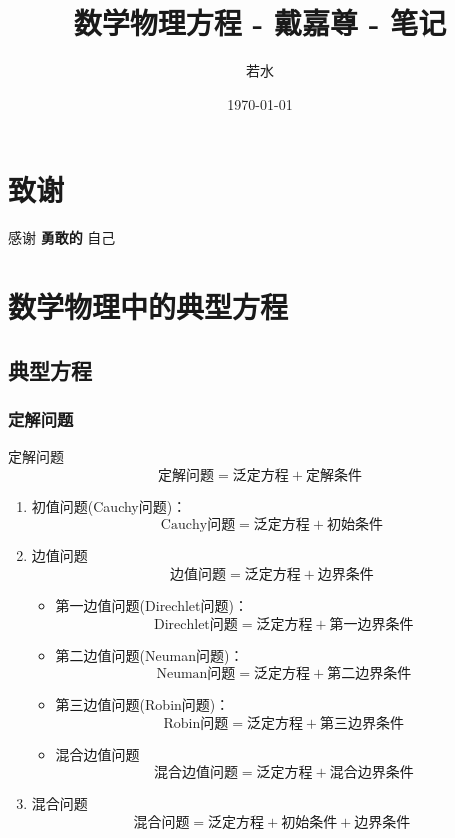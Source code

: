 \documentclass[lang = cn, scheme = chinese, thmcnt = section]{elegantbook}
\title{数学物理方程 - 戴嘉尊 - 笔记}                %
\author{若水}                        %
\date{\today}                       %
\begin{document}
\maketitle       %

\frontmatter     %

\chapter*{致谢}


\vspace*{\fill}
\begin{center}
	
	\large{感谢 \textbf{ 勇敢的 } 自己}
	
\end{center}
\vspace*{\fill}

\tableofcontents %

\mainmatter      %

\chapter{数学物理中的典型方程}

\section{典型方程}

\subsection{定解问题}

\begin{definition}{定解问题}
	$$
	\text{定解问题}=\text{泛定方程}+\text{定解条件}
	$$
	\begin{enumerate}
		\item 初值问题(Cauchy问题)：
		$$
		\text{Cauchy问题}=\text{泛定方程}+\text{初始条件}
		$$
		\item 边值问题
		$$
		\text{边值问题}=\text{泛定方程}+\text{边界条件}
		$$
		\begin{itemize}
			\item 第一边值问题(Direchlet问题)：
			$$
			\text{Direchlet问题}=\text{泛定方程}+\text{第一边界条件}
			$$
			\item 第二边值问题(Neuman问题)：
			$$
			\text{Neuman问题}=\text{泛定方程}+\text{第二边界条件}
			$$
			\item 第三边值问题(Robin问题)：
			$$
			\text{Robin问题}=\text{泛定方程}+\text{第三边界条件}
			$$
			\item 混合边值问题
			$$
			\text{混合边值问题}=\text{泛定方程}+\text{混合边界条件}
			$$
		\end{itemize}
		\item 混合问题
		$$
		\text{混合问题}=\text{泛定方程}+\text{初始条件}+\text{边界条件}
		$$
	\end{enumerate}
\end{definition}
\end{document}
